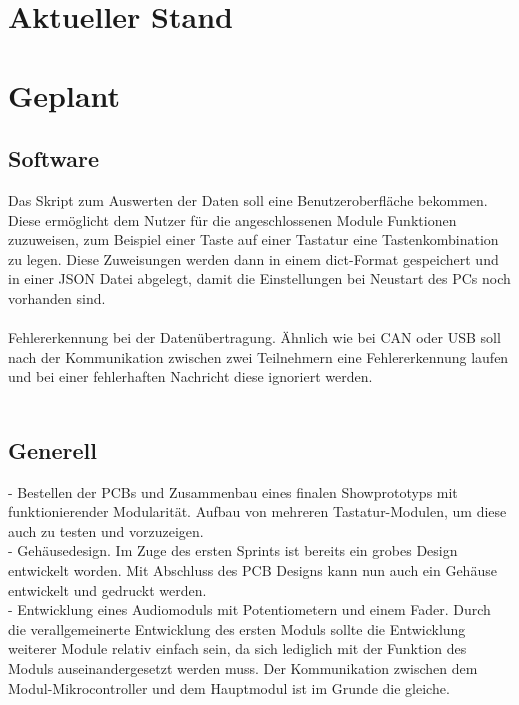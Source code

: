 \section{Aktueller Stand}
\subsection{}

\section{Geplant}
\subsection{Software}
Das Skript zum Auswerten der Daten soll eine Benutzeroberfläche bekommen. Diese ermöglicht dem Nutzer für die angeschlossenen Module Funktionen zuzuweisen, zum Beispiel einer Taste auf einer Tastatur eine Tastenkombination zu legen. Diese Zuweisungen werden dann in einem dict-Format gespeichert und in einer JSON Datei abgelegt, damit die Einstellungen bei Neustart des PCs noch vorhanden sind. \\\\
Fehlererkennung bei der Datenübertragung. Ähnlich wie bei CAN oder USB soll nach der Kommunikation zwischen zwei Teilnehmern eine Fehlererkennung laufen und bei einer fehlerhaften Nachricht diese ignoriert werden. \\\\

\subsection{Generell}
- Bestellen der PCBs und Zusammenbau eines finalen Showprototyps mit funktionierender Modularität. Aufbau von mehreren Tastatur-Modulen, um diese auch zu testen und vorzuzeigen. \\
- Gehäusedesign. Im Zuge des ersten Sprints ist bereits ein grobes Design entwickelt worden. Mit Abschluss des PCB Designs kann nun auch ein Gehäuse entwickelt und gedruckt werden. \\
- Entwicklung eines Audiomoduls mit Potentiometern und einem Fader. Durch die verallgemeinerte Entwicklung des ersten Moduls sollte die Entwicklung weiterer Module relativ einfach sein, da sich lediglich mit der Funktion des Moduls auseinandergesetzt werden muss. Der Kommunikation zwischen dem Modul-Mikrocontroller und dem Hauptmodul ist im Grunde die gleiche.